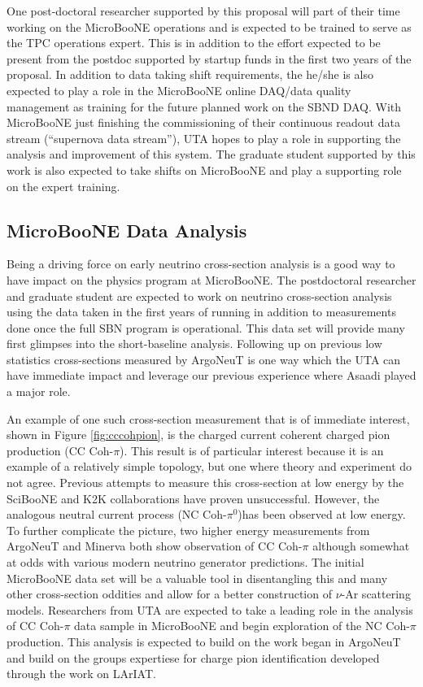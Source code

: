One post-doctoral researcher supported by this proposal will part of their time working on the MicroBooNE operations and is expected to be trained to serve as the TPC operations expert. This is in addition to the effort expected to be present from the postdoc supported by startup funds in the first two years of the proposal. In addition to data taking shift requirements, the he/she is also expected to play a role in the MicroBooNE online DAQ/data quality management as training for the future planned work on the SBND DAQ. With MicroBooNE just finishing the commissioning of their continuous readout data stream (``supernova data stream''), UTA hopes to play a role in supporting the analysis and improvement of this system. The graduate student supported by this work is also expected to take shifts on MicroBooNE and play a supporting role on the expert training.


\subsection{MicroBooNE Data Analysis}\label{sec:UbooneDataAnalysis}
Being a driving force on early neutrino cross-section analysis is a good way to have impact on the physics program at MicroBooNE. The postdoctoral researcher and graduate student are expected to work on neutrino cross-section analysis using the data taken in the first years of running in addition to measurements done once the full SBN program is operational. This data set will provide many first glimpses into the short-baseline analysis. Following up on previous low statistics cross-sections measured by ArgoNeuT is one way which the UTA can have immediate impact and leverage our previous experience where Asaadi played a major role. 

An example of one such cross-section measurement that is of immediate interest, shown in Figure \ref{fig:cccohpion}, is the charged current coherent charged pion production (CC Coh-$\pi$). This result is of particular interest because it is an example of a relatively simple topology, but one where theory and experiment do not agree. Previous attempts to measure this cross-section at low energy by the SciBooNE and K2K collaborations have proven unsuccessful. However, the analogous neutral current process (NC Coh-$\pi^{0}$)has been observed at low energy. To further complicate the picture, two higher energy measurements from ArgoNeuT and Minerva both show observation of CC Coh-$\pi$ although somewhat at odds with various modern neutrino generator predictions. The initial MicroBooNE data set will be a valuable tool in disentangling this and many other cross-section oddities and allow for a better construction of $\nu$-Ar scattering models. Researchers from UTA are expected to take a leading role in the analysis of CC Coh-$\pi$ data sample in MicroBooNE and begin exploration of the NC Coh-$\pi$ production. This analysis is expected to build on the work began in ArgoNeuT \cite{} and build on the groups expertiese for charge pion identification developed through the work on LArIAT.
 
